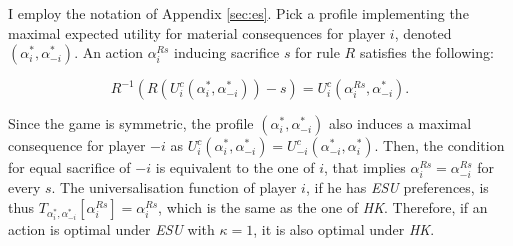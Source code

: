 \begin{eqproof}
	I employ the notation of Appendix \ref{sec:es}. Pick a profile implementing the maximal expected utility for material consequences for player \(i\), denoted \(\left(\alpha^{*}_i, \alpha^{*}_{-i} \right)\). An action \(\alpha^{Rs}_i\) inducing sacrifice \(s\) for rule \(R\) satisfies the following:

	\[
		R^{-1} \left( R \left( U^{c}_i \left( \alpha^{*}_i, \alpha^{*}_{-i} \right) \right) - s \right) = U^{c}_i \left( \alpha^{Rs}_i, \alpha^{*}_{-i} \right) .
	\]

	Since the game is symmetric, the profile \(\left( \alpha^{*}_i, \alpha^{*}_{-i} \right)\) also induces a maximal consequence for player \(-i\) as \(U^{c}_i \left( \alpha^{*}_i, \alpha^{*}_{-i} \right) = U^{c}_{-i} \left( \alpha^{*}_{-i}, \alpha^{*}_{i} \right)\). Then, the condition for equal sacrifice of \(-i\) is equivalent to the one of \(i\), that implies \(\alpha^{Rs}_{i} = \alpha^{Rs}_{-i}\) for every \(s\). The universalisation function of player \(i\), if he has \textit{ESU} preferences, is thus \( T_{\alpha^{*}_i, \alpha^{*}_{-i}} \left[ \alpha^{Rs}_i \right] = \alpha_{i}^{Rs} \), which is the same as the one of \textit{HK}. Therefore, if an action is optimal under \textit{ESU} with \( \kappa = 1 \), it is also optimal under \textit{HK}.
\end{eqproof}

